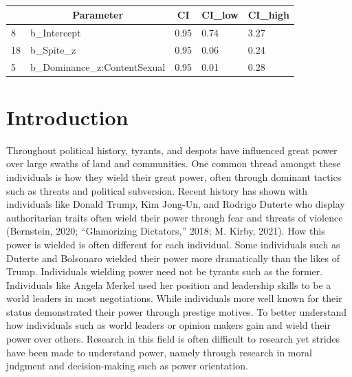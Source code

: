 \documentclass[
  donotrepeattitle,doc, 12pt, a4paper,floatsintext]{apa7}
\begin{document}
\newpage

\begin{table}[tbp]

\begin{center}
\begin{threeparttable}

\caption{\label{tab:unnamed-chunk-7}}

\begin{tabular}{lllll}
\toprule
 & \multicolumn{1}{c}{Parameter} & \multicolumn{1}{c}{CI} & \multicolumn{1}{c}{CI\_low} & \multicolumn{1}{c}{CI\_high}\\
\midrule
8 & b\_Intercept & 0.95 & 0.74 & 3.27\\
18 & b\_Spite\_z & 0.95 & 0.06 & 0.24\\
5 & b\_Dominance\_z:ContentSexual & 0.95 & 0.01 & 0.28\\
\bottomrule
\end{tabular}

\end{threeparttable}
\end{center}

\end{table}

\hypertarget{introduction}{%
\section{Introduction}\label{introduction}}

Throughout political history, tyrants, and despots have influenced great power over large swaths of land and communities. One common thread amongst these individuals is how they wield their great power, often through dominant tactics such as threats and political subversion. Recent history has shown with individuals like Donald Trump, Kim Jong-Un, and Rodrigo Duterte who display authoritarian traits often wield their power through fear and threats of violence (Bernstein, 2020; {``Glamorizing Dictators,''} 2018; M. Kirby, 2021). How this power is wielded is often different for each individual. Some individuals such as Duterte and Bolsonaro wielded their power more dramatically than the likes of Trump. Individuals wielding power need not be tyrants such as the former. Individuals like Angela Merkel used her position and leadership skills to be a world leaders in most negotiations. While individuals more well known for their status demonstrated their power through prestige motives. To better understand how individuals such as world leaders or opinion makers gain and wield their power over others. Research in this field is often difficult to research yet strides have been made to understand power, namely through research in moral judgment and decision-making such as power orientation.
\end{document}
